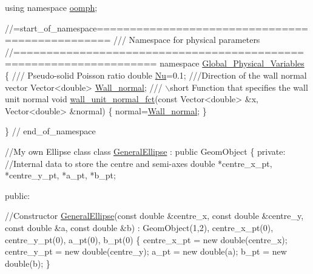 \begin{DoxyCodeInclude}
\textcolor{keyword}{using namespace }\hyperlink{namespaceoomph}{oomph};


\textcolor{comment}{//=start\_of\_namespace================================================}\textcolor{comment}{}
\textcolor{comment}{/// Namespace for physical parameters}
\textcolor{comment}{}\textcolor{comment}{//===================================================================}
\textcolor{keyword}{namespace }\hyperlink{namespaceGlobal__Physical__Variables}{Global\_Physical\_Variables}
\{
\textcolor{comment}{}
\textcolor{comment}{ /// Pseudo-solid Poisson ratio}
\textcolor{comment}{} \textcolor{keywordtype}{double} \hyperlink{namespaceGlobal__Physical__Variables_a3962c36313826b19f216f6bbbdd6a477}{Nu}=0.1;
\textcolor{comment}{}
\textcolor{comment}{ ///Direction of the wall normal vector}
\textcolor{comment}{} Vector<double> \hyperlink{namespaceGlobal__Physical__Variables_a5feb3df21fc4a0adefadecb8a8ed98d7}{Wall\_normal};
\textcolor{comment}{}
\textcolor{comment}{ /// \(\backslash\)short Function that specifies the wall unit normal}
\textcolor{comment}{} \textcolor{keywordtype}{void} \hyperlink{namespaceGlobal__Physical__Variables_a0d48e8726fa485de2b2df2d5031ec41b}{wall\_unit\_normal\_fct}(\textcolor{keyword}{const} Vector<double> &x, 
                      Vector<double> &normal)
 \{
  normal=\hyperlink{namespaceGlobal__Physical__Variables_a5feb3df21fc4a0adefadecb8a8ed98d7}{Wall\_normal};
 \}

\} \textcolor{comment}{// end\_of\_namespace}


\textcolor{comment}{//My own Ellipse class}
\textcolor{keyword}{class }\hyperlink{classGeneralEllipse}{GeneralEllipse} : \textcolor{keyword}{public} GeomObject
\{
\textcolor{keyword}{private}:
 \textcolor{comment}{//Internal data to store the centre and semi-axes}
 \textcolor{keywordtype}{double} *centre\_x\_pt, *centre\_y\_pt, *a\_pt, *b\_pt;

\textcolor{keyword}{public}:
 
 \textcolor{comment}{//Constructor}
 \hyperlink{classGeneralEllipse}{GeneralEllipse}(\textcolor{keyword}{const} \textcolor{keywordtype}{double} &centre\_x, \textcolor{keyword}{const} \textcolor{keywordtype}{double} &centre\_y,
                \textcolor{keyword}{const} \textcolor{keywordtype}{double} &a, \textcolor{keyword}{const} \textcolor{keywordtype}{double} &b)
  : GeomObject(1,2), centre\_x\_pt(0), centre\_y\_pt(0), a\_pt(0), b\_pt(0)
  \{
   centre\_x\_pt = \textcolor{keyword}{new} double(centre\_x);
   centre\_y\_pt = \textcolor{keyword}{new} double(centre\_y);
   a\_pt = \textcolor{keyword}{new} double(a);
   b\_pt = \textcolor{keyword}{new} double(b);
  \}


\end{DoxyCodeInclude}
